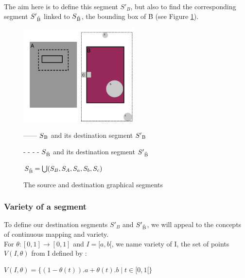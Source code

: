 \documentclass[a4paper]{article}
\begin{document}
The aim here is to define this segment $S'_B$, but also to find the corresponding segment $S'\textsubscript{\r{B}}$ linked to $S\textsubscript{\r{B}}$, the bounding box of \r{B} (see Figure \ref{fig:sync}).

\begin{figure}[h]

\begin{multicols}{2}

\includegraphics[width=6cm]{img/exemple2.png}   	            

\columnbreak

 ------  $S\textsubscript{B}$ and its destination segment $S'\textsubscript{B}$

\bigskip

 - - - -  $S\textsubscript{\r{B}}$ and its destination segment $S'\textsubscript{\r{B}}$

\bigskip

 $S\textsubscript{\r{B}} = \bigcup(S_B, S_A, S_a, S_b, S_c) $

\end{multicols}
\caption{The source and destination graphical segments}
\label{fig:sync}
\end{figure}


\subsubsection{Variety of a segment}\label{subsubsec:variety}

To define our destination segments $S'_B$ and $S'\textsubscript{\r{B}}$, we will appeal to the concepts of continuous mapping and variety.
\\

For $\theta : [0,1] \rightarrow [0,1]$ and $I = [a,b[$, we name variety of I, the set of points $V(I,\theta)$ from I defined by :
\begin{center}
$V(I, \theta) =  \lbrace (1 - \theta(t)).a + \theta(t).b \mid t \in [0, 1[ \rbrace$ 
\end{center}
\end{document}
